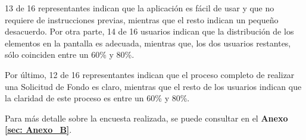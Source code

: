 13 de 16 representantes indican que la aplicación es fácil de usar y que no requiere de instrucciones previas, mientras que el resto indican un pequeño desacuerdo. Por otra parte, 14 de 16 usuarios indican que la distribución de los elementos en la pantalla es adecuada, mientras que, los dos usuarios restantes, sólo coinciden entre un 60\% y 80\%.

Por último, 12 de 16 representantes indican que el proceso completo de realizar una Solicitud de Fondo es claro, mientras que el resto de los usuarios indican que la claridad de este proceso es entre un 60\% y 80\%.

Para más detalle sobre la encuesta realizada, se puede consultar en el \textbf{Anexo \ref{sec: Anexo_B}}.


